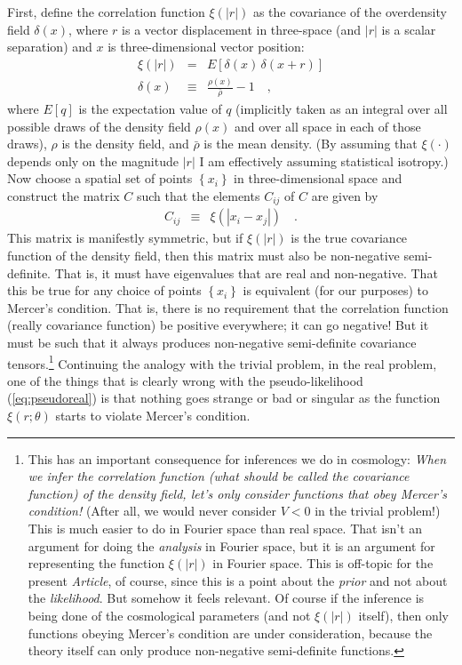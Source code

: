 \documentclass[12pt, letterpaper, preprint]{aastex}
\newcommand{\setof}[1]{\left\{{#1}\right\}}
\newcommand{\documentname}{\textsl{Article}}
\begin{document}
First, define the correlation function $\xi(|r|)$ as the covariance of
the overdensity field $\delta(x)$, where $r$ is a vector displacement
in three-space (and $|r|$ is a scalar separation) and $x$ is
three-dimensional vector position:
\begin{eqnarray}
\xi(|r|) &=& E[\delta(x)\,\delta(x+r)]
\\
\delta(x) &\equiv& \frac{\rho(x)}{\bar{\rho}} - 1
\quad ,
\end{eqnarray}
where $E[q]$ is the expectation value of $q$ (implicitly taken as an integral
over all possible draws of the density field $\rho(x)$ and over all space in each of those draws),
$\rho$ is the density field,
and $\bar{\rho}$ is the mean density.
(By assuming that $\xi(\cdot)$ depends only on the magnitude $|r|$ I am effectively
assuming statistical isotropy.)
Now choose a spatial set of points $\setof{x_i}$ in three-dimensional space
and construct the matrix $C$ such that the elements $C_{ij}$ of $C$
are given by
\begin{eqnarray}
C_{ij} &\equiv& \xi(|x_i - x_j|)
\quad .
\end{eqnarray}
This matrix is manifestly symmetric, but if $\xi(|r|)$ is the true
covariance function of the density field, then this matrix must also
be non-negative semi-definite.
That is, it must have eigenvalues that are real and non-negative.
That this be true for any choice of points $\setof{x_i}$ is equivalent
(for our purposes) to Mercer's condition.
That is, there is no requirement that the correlation function (really
covariance function) be positive everywhere; it can go negative!
But it must be such that it always produces non-negative semi-definite
covariance tensors.\footnote{This has an important consequence for
  inferences we do in cosmology: \emph{When we infer the correlation
    function (what should be called the covariance function) of the
    density field, let's only consider functions that obey Mercer's
    condition!}  (After all, we would never consider $V<0$ in the
  trivial problem!)  This is much easier to do in Fourier space than
  real space.  That isn't an argument for doing the \emph{analysis} in
  Fourier space, but it is an argument for representing the function
  $\xi(|r|)$ in Fourier space. This is off-topic for the present
  \documentname, of course, since this is a point about the
  \emph{prior} and not about the \emph{likelihood}. But somehow it
  feels relevant. Of course if the inference is being done of the
  cosmological parameters (and not $\xi(|r|)$ itself), then only
  functions obeying Mercer's condition are under consideration,
  because the theory itself can only produce non-negative
  semi-definite functions.}
Continuing the analogy with the trivial problem, in the real problem,
one of the things that is clearly wrong with the pseudo-likelihood
(\ref{eq:pseudoreal}) is that nothing goes strange or bad or singular as
the function $\xi(r;\theta)$ starts to violate Mercer's condition.
\end{document}
